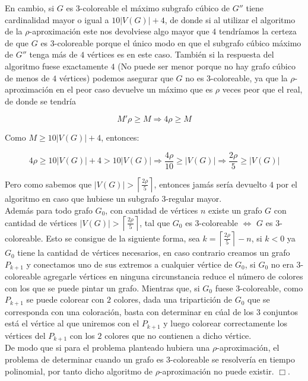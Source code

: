 \documentclass{article}
\begin{document}
En cambio, si $G$ es $3$-coloreable el m\'aximo subgrafo c\'ubico de $G''$ tiene cardinalidad mayor o igual a $10|V(G)| + 4$, de donde si al utilizar el algoritmo de la $\rho$-aproximaci\'on 
este nos devolviese algo mayor que $4$ tendr\'iamos la certeza de que $G$ es $3$-coloreable porque el \'unico modo en que el subgrafo c\'ubico m\'aximo de $G''$ tenga m\'as de $4$ v\'ertices es en este caso. Tambi\'en si 
la respuesta del algoritmo fuese exactamente $4$ (No puede ser menor porque no hay grafo c\'ubico de menos de $4$ v\'ertices) podemos asegurar que $G$ no es $3$-coloreable, ya que la $\rho$-aproximaci\'on en el peor caso devuelve un m\'aximo que es $\rho$ veces 
peor que el real, de donde se tendr\'ia 

$$M'\rho \geq M \Rightarrow 4\rho \geq M$$

Como $M \geq 10|V(G)| + 4$, entonces: 

$$4\rho \geq 10|V(G)| + 4 > 10|V(G)| \Rightarrow \frac{4\rho}{10} \geq |V(G)| \Rightarrow \frac{2\rho}{5} \geq |V(G)|$$

Pero como sabemos que $|V(G)| >  \left\lceil\frac{2\rho}{5} \right\rceil $, entonces jam\'as ser\'ia devuelto $4$ por el algoritmo en caso que hubiese un subgrafo $3$-regular mayor.\\ 

Adem\'as para todo grafo $G_0$, con cantidad de v\'ertices $n$ existe un grafo $G$ con cantidad de v\'ertices $|V(G)| >  \left\lceil\frac{2\rho}{5} \right\rceil $, tal que $G_0$ es $3$-coloreable $\Leftrightarrow$ $G$ es $3$-coloreable. Esto se consigue de la 
siguiente forma, sea $k = \left\lceil\frac{2\rho}{5} \right\rceil - n$, si $k < 0$ ya $G_0$ tiene la cantidad de v\'ertices necesarios, en caso contrario creamos un grafo $P_{k+1}$ y conectamos uno de sus extremos a cualquier v\'ertice de $G_0$, si $G_0$ no era $3$-coloreable 
agregarle v\'ertices en ninguna circunstancia reduce el n\'umero de colores con los que se puede pintar un grafo. Mientras que, si $G_0$ fuese $3$-coloreable, como $P_{k+1}$ se puede colorear con $2$ colores, dada una tripartici\'on de $G_0$ que se corresponda con una coloraci\'on, basta con determinar en 
c\'ual de los $3$ conjuntos est\'a el v\'ertice al que uniremos con el $P_{k+1}$ y luego colorear correctamente los v\'ertices del $P_{k+1}$ con los $2$ colores que no contienen a dicho v\'ertice.\\ 

De modo que si para el problema planteado hubiera una $\rho$-aproximaci\'on, el problema de determinar cuando un grafo es $3$-coloreable se resolver\'ia en tiempo polinomial, por tanto dicho algoritmo de $\rho$-aproximaci\'on no 
puede existir. $\Box $.
\end{document}
